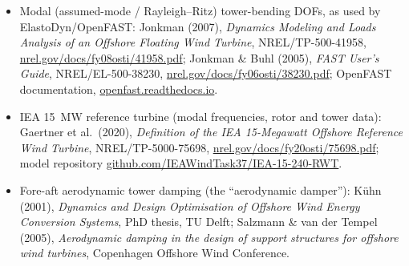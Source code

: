 \begin{itemize}
  \item Modal (assumed-mode / Rayleigh--Ritz) tower-bending DOFs, as used by
        ElastoDyn/OpenFAST: Jonkman (2007), \emph{Dynamics Modeling and Loads
        Analysis of an Offshore Floating Wind Turbine}, NREL/TP-500-41958,
        \href{https://www.nrel.gov/docs/fy08osti/41958.pdf}{nrel.gov/docs/fy08osti/41958.pdf};
        Jonkman \& Buhl (2005), \emph{FAST User's Guide}, NREL/EL-500-38230,
        \href{https://www.nrel.gov/docs/fy06osti/38230.pdf}{nrel.gov/docs/fy06osti/38230.pdf};
        OpenFAST documentation, \href{https://openfast.readthedocs.io/}{openfast.readthedocs.io}.
  \item IEA \SI{15}{\mega\watt} reference turbine (modal frequencies, rotor and
        tower data): Gaertner et al.\ (2020), \emph{Definition of the IEA
        15-Megawatt Offshore Reference Wind Turbine}, NREL/TP-5000-75698,
        \href{https://www.nrel.gov/docs/fy20osti/75698.pdf}{nrel.gov/docs/fy20osti/75698.pdf};
        model repository
        \href{https://github.com/IEAWindTask37/IEA-15-240-RWT}{github.com/IEAWindTask37/IEA-15-240-RWT}.
  \item Fore-aft aerodynamic tower damping (the ``aerodynamic damper''):
        K\"uhn (2001), \emph{Dynamics and Design Optimisation of Offshore Wind
        Energy Conversion Systems}, PhD thesis, TU Delft; Salzmann \& van der
        Tempel (2005), \emph{Aerodynamic damping in the design of support
        structures for offshore wind turbines}, Copenhagen Offshore Wind
        Conference.
\end{itemize}
